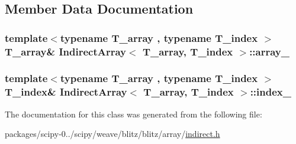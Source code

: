 \subsection{Member Data Documentation}
\hypertarget{classIndirectArray_adac5f29ea2d36134540235f6975c85fc}{}
\subsubsection[{array\+\_\+}]{\setlength{\rightskip}{0pt plus 5cm}template$<$typename T\+\_\+array , typename T\+\_\+index $>$ T\+\_\+array\& {\bf Indirect\+Array}$<$ T\+\_\+array, T\+\_\+index $>$\+::array\+\_\+\hspace{0.3cm}{\ttfamily [protected]}}\label{classIndirectArray_adac5f29ea2d36134540235f6975c85fc}
\hypertarget{classIndirectArray_aa3c1cbd2ad06a6c2623dbf614589951f}{}
\subsubsection[{index\+\_\+}]{\setlength{\rightskip}{0pt plus 5cm}template$<$typename T\+\_\+array , typename T\+\_\+index $>$ T\+\_\+index\& {\bf Indirect\+Array}$<$ T\+\_\+array, T\+\_\+index $>$\+::index\+\_\+\hspace{0.3cm}{\ttfamily [protected]}}\label{classIndirectArray_aa3c1cbd2ad06a6c2623dbf614589951f}


The documentation for this class was generated from the following file\+:\begin{DoxyCompactItemize}
\item 
packages/scipy-\/0../scipy/weave/blitz/blitz/array/\hyperlink{indirect_8h}{indirect.\+h}\end{DoxyCompactItemize}
